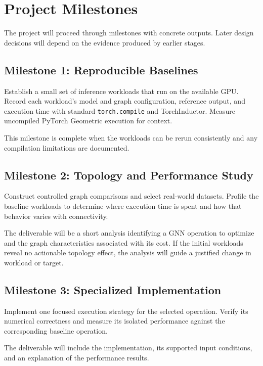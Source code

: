 \section{Project Milestones}
\label{sec:project-milestones}

The project will proceed through milestones with concrete outputs. Later design decisions will depend on the evidence produced by earlier stages.

\subsection{Milestone 1: Reproducible Baselines}

Establish a small set of inference workloads that run on the available GPU. Record each workload's model and graph configuration, reference output, and execution time with standard \texttt{torch.compile} and TorchInductor. Measure uncompiled PyTorch Geometric execution for context.

This milestone is complete when the workloads can be rerun consistently and any compilation limitations are documented.

\subsection{Milestone 2: Topology and Performance Study}

Construct controlled graph comparisons and select real-world datasets. Profile the baseline workloads to determine where execution time is spent and how that behavior varies with connectivity.

The deliverable will be a short analysis identifying a GNN operation to optimize and the graph characteristics associated with its cost. If the initial workloads reveal no actionable topology effect, the analysis will guide a justified change in workload or target.

\subsection{Milestone 3: Specialized Implementation}

Implement one focused execution strategy for the selected operation. Verify its numerical correctness and measure its isolated performance against the corresponding baseline operation.

The deliverable will include the implementation, its supported input conditions, and an explanation of the performance results.


